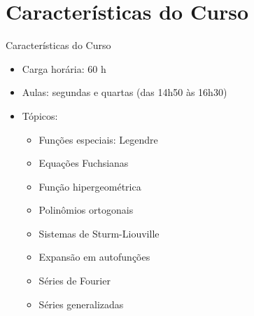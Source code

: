 \documentclass[
size=17pt,
paper=smartboard,
mode=present,
display=slidesnotes,
style=paintings,
nopagebreaks,
blackslide,
fleqn]{powerdot}
\begin{document}
   \section[ slide = false ]{Características do Curso}
      \begin{slide}[toc=]{Características do Curso}
         \begin{itemize}
            \item Carga horária: 60 h
            \item Aulas: segundas e quartas (das 14h50 às 16h30)
            \item Tópicos:
            \begin{itemize}
               \item Funções especiais: Legendre
               \item Equações Fuchsianas
               \item Função hipergeométrica
               \item Polinômios ortogonais
	       \item Sistemas de Sturm-Liouville
               \item Expansão em autofunções
               \item Séries de Fourier
	       \item Séries generalizadas
            \end{itemize}
         \end{itemize}         
      \end{slide}
      
\end{document}
